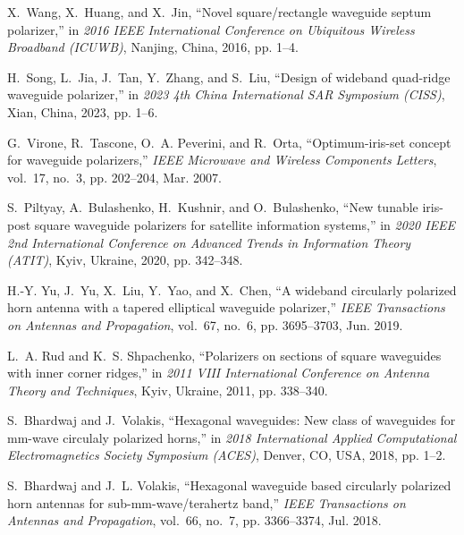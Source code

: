 \documentclass[journal]{IEEEtran}
\begin{document}
\begin{thebibliography}{99}
    X.~Wang, X.~Huang, and X.~Jin, ``Novel square/rectangle waveguide septum polarizer,'' in \emph{2016 IEEE International Conference on Ubiquitous Wireless Broadband (ICUWB)}, Nanjing, China, 2016, pp. 1--4.

    H.~Song, L.~Jia, J.~Tan, Y.~Zhang, and S.~Liu, ``Design of wideband quad-ridge waveguide polarizer,'' in \emph{2023 4th China International SAR Symposium (CISS)}, Xian, China, 2023, pp. 1--6.

    G.~Virone, R.~Tascone, O.~A. Peverini, and R.~Orta, ``Optimum-iris-set concept for waveguide polarizers,'' \emph{IEEE Microwave and Wireless Components Letters}, vol.~17, no.~3, pp. 202--204, Mar. 2007.

    S.~Piltyay, A.~Bulashenko, H.~Kushnir, and O.~Bulashenko, ``New tunable iris-post square waveguide polarizers for satellite information systems,'' in \emph{2020 IEEE 2nd International Conference on Advanced Trends in Information Theory (ATIT)}, Kyiv, Ukraine, 2020, pp. 342--348.

    H.-Y. Yu, J.~Yu, X.~Liu, Y.~Yao, and X.~Chen, ``A wideband circularly polarized horn antenna with a tapered elliptical waveguide polarizer,'' \emph{IEEE Transactions on Antennas and Propagation}, vol.~67, no.~6, pp. 3695--3703, Jun. 2019.

    L.~A. Rud and K.~S. Shpachenko, ``Polarizers on sections of square waveguides with inner corner ridges,'' in \emph{2011 VIII International Conference on Antenna Theory and Techniques}, Kyiv, Ukraine, 2011, pp. 338--340.

    S.~Bhardwaj and J.~Volakis, ``Hexagonal waveguides: New class of waveguides for mm-wave circulaly polarized horns,'' in \emph{2018 International Applied Computational Electromagnetics Society Symposium (ACES)}, Denver, CO, USA, 2018, pp. 1--2.

    S.~Bhardwaj and J.~L. Volakis, ``Hexagonal waveguide based circularly polarized horn antennas for sub-mm-wave/terahertz band,'' \emph{IEEE Transactions on Antennas and Propagation}, vol.~66, no.~7, pp. 3366--3374, Jul. 2018.


\end{thebibliography}
\end{document}
